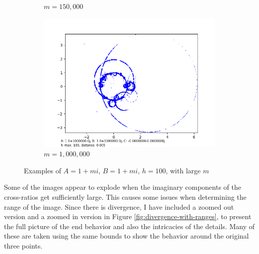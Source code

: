 \documentclass[12pt,a4paper,reqno,parskip=full]{amsart}
\numberwithin{equation}{section}
\theoremstyle{plain}
\theoremstyle{definition}
\begin{document}
\begin{figure}[H]
\begin{subfigure}[b]{0.3\textwidth}
         \caption{$m=150,000$}
         \label{fig:m150,000}
     \end{subfigure}
     \hfill 
     \begin{subfigure}[b]{0.3\textwidth}
         \centering
         \includegraphics[width=\textwidth]{images/m/a1,000,000,b1,000,000,h100,d.005.png}
         \caption{$m=1,000,000$}
         \label{fig:m1,000,000}
     \end{subfigure}
        \caption{Examples of $A=1+mi$, $B=1+mi$, $h=100$, with large $m$}
        \label{fig:large-m}
\end{figure}

Some of the images appear to explode when the imaginary components of the cross-ratios get sufficiently large. This causes some issues when determining the range of the image. Since there is divergence, I have included a zoomed out version and a zoomed in version in Figure \ref{fig:divergence-with-ranges}, to present the full picture of the end behavior and also the intricacies of the details. Many of these are taken using the same bounds to show the behavior around the original three points.
\end{document}
